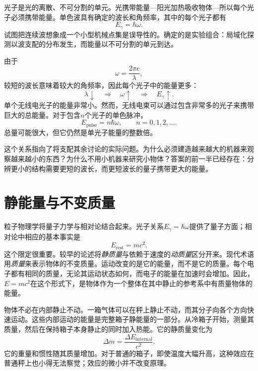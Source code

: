 光子是光的离散、不可分割的单元。光携带能量---阳光加热吸收物体---所以每个光子必须携带能量。单色波具有确定的波长和角频率，其中的每个光子都有
\begin{equation}
E_\gamma=\hbar\omega.
\end{equation}
试图把连续波想象成一个小型机械点集是误导性的。确定的是实验组合：局域化探测以波支配的分布发生，而能量以不可分割的单元到达。

由于
\begin{equation}
\omega=\frac{2\pi c}{\lambda},
\end{equation}
较短的波长意味着较大的角频率，因此每个光子中的能量更多：
\begin{equation}
\lambda\downarrow
\quad\Longrightarrow\quad
\omega\uparrow
\quad\Longrightarrow\quad
E_\gamma\uparrow.
\end{equation}
单个无线电光子的能量非常小。然而，无线电束可以通过包含非常多的光子来携带巨大的总能量。对于包含\(n\)个光子的单色脉冲，
\begin{equation}
E_{\text{pulse}}=n\hbar\omega,
\qquad
n=0,1,2,\ldots.
\end{equation}
总量可能很大，但它仍然是单光子能量的整数倍。

这个关系指向了将支配其余讨论的实际问题。为什么必须建造越来越大的机器来观察越来越小的东西？为什么不用小机器来研究小物体？答案的前一半已经存在：分辨更小的结构需要更短的波长，而更短波长的量子携带更大的能量。

\section{静能量与不变质量}

粒子物理学将量子力学与相对论结合起来。光子关系\(E_\gamma=\hbar\omega\)提供了量子方面；相对论中相应的基本事实是
\begin{equation}
E_{\mathrm{rest}}=mc^2.
\end{equation}
这个限定很重要。较早的论述将\emph{静质量}与依赖于速度的\emph{动质量}区分开来。现代术语用\emph{质量}来表示物体的不变质量。运动改变的是它的能量，而不是它的质量。每个电子都有相同的质量，无论其运动状态如何，而电子的能量在加速时会增加。因此，\(E=mc^2\)在这个形式下，是物体作为一个整体在其中静止的参考系中有质量物体的能量。

物体不必在内部静止不动。一箱气体可以在秤上静止不动，而其分子向各个方向快速运动。这些内部运动的能量是完整箱子静能量的一部分。从冷箱子开始，测量其质量，然后在保持箱子本身静止的同时加入热能。它的静质量变化为
\begin{equation}
\Delta m=\frac{\Delta E_{\mathrm{internal}}}{c^2}.
\end{equation}
它的重量和惯性随其质量增加。对于普通的箱子，即使温度大幅升高，这种效应在普通秤上也小得无法察觉；效应的微小并不改变原理。

